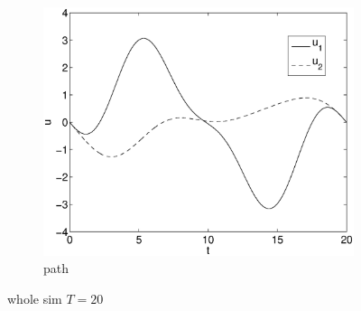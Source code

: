 \begin{figure}[h]
\begin{subfigure}[b]{\textwidth}
\centering
\includegraphics[height=0.3\textheight]{img/final_15_1_20_u.eps}
\caption{path}
\end{subfigure}
\caption{whole sim $T=20$}
\end{figure}


